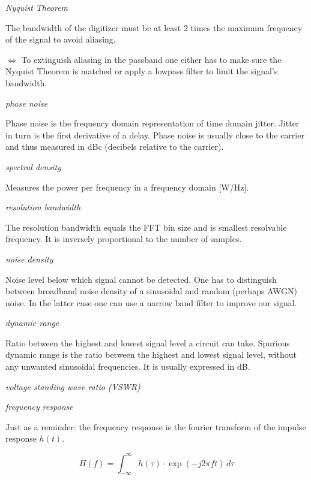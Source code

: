 \documentclass{article}
\begin{document}
\emph{Nyquist Theorem}

The bandwidth of the digitizer must be at least 2 times the maximum frequency of the signal to avoid aliasing. 

\medskip

$\Leftrightarrow$ To extinguish aliasing in the passband one either has to make sure the Nyquist Theorem is matched or apply a lowpass filter to limit the signal's bandwidth.

\bigskip

\emph{phase noise}

Phase noise is the frequency domain representation of time domain jitter. Jitter in turn is the first derivative of a delay. Phase noise is usually close to the carrier and thus measured in dBc (decibels relative to the carrier).

\bigskip

\emph{spectral density}

Measures the power per frequency in a frequency domain [W/Hz].

\bigskip

\emph{resolution bandwidth}

The resolution bandwidth equals the FFT bin size and is smallest resolvable frequency. It is inversely proportional to the number of samples.

\bigskip

\emph{noise density}

Noise level below which signal cannot be detected. One has to distinguish between broadband noise density of a sinusoidal and random (perhaps AWGN) noise. In the latter case one can use a narrow band filter to improve our signal. 

\bigskip

\emph{dynamic range}

Ratio between the highest and lowest signal level a circuit can take. Spurious dynamic range is the ratio between the highest and lowest signal level, without any unwanted sinusoidal frequencies. It is usually expressed in dB.

\bigskip

\emph{voltage standing wave ratio (VSWR)}

\bigskip

\emph{frequency response}

Just as a reminder: the frequency response is the fourier transform of the impulse response $h(t)$.

$$
	H(f) = \int_{-\infty}^{\infty} h(\tau) \cdot \exp(-j2\pi ft) \,d\tau
$$
\end{document}
